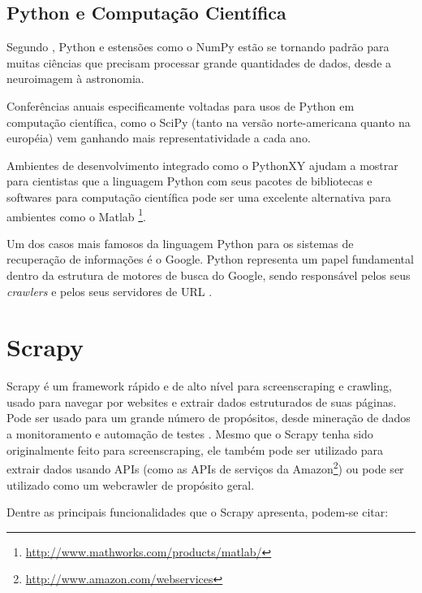 \subsection{Python e Computação Científica}

Segundo \cite{python_scientific_world}, Python e estensões como o NumPy \cite{numpy} estão se tornando padrão para muitas ciências que precisam processar grande quantidades de dados, desde a neuroimagem à astronomia.

Conferências anuais especificamente voltadas para usos de Python em computação científica, como o SciPy \cite{scipy} (tanto na versão norte-americana quanto na européia) vem ganhando mais representatividade a cada ano.

Ambientes de desenvolvimento integrado como o PythonXY \cite{pythonxy} ajudam a mostrar para cientistas que a linguagem Python com seus pacotes de bibliotecas e softwares para computação científica pode ser uma excelente alternativa para ambientes como o Matlab \footnote{\url{http://www.mathworks.com/products/matlab/}}. 

Um dos casos mais famosos da linguagem Python para os sistemas de recuperação de informações é o Google\cite{google}. Python representa um papel fundamental dentro da estrutura de motores de busca do Google, sendo responsável pelos seus \emph{crawlers} e pelos seus servidores de URL \cite{surveyir}.

\pagebreak
\section{Scrapy}

Scrapy é um framework rápido e de alto nível para \gls{screenscraping} e \gls{crawling}, usado para navegar por websites e extrair dados estruturados de suas páginas. Pode ser usado para um grande número de propósitos, desde mineração de dados a monitoramento e automação de testes \cite{scrapy}. Mesmo que o Scrapy tenha sido originalmente feito para \gls{screenscraping}, ele também pode ser utilizado para extrair dados usando APIs (como as APIs de serviços da Amazon\footnote{\url{http://www.amazon.com/webservices}}) ou pode ser utilizado como um \gls{webcrawler} de propósito geral.

Dentre as principais funcionalidades que o Scrapy apresenta, podem-se citar:

